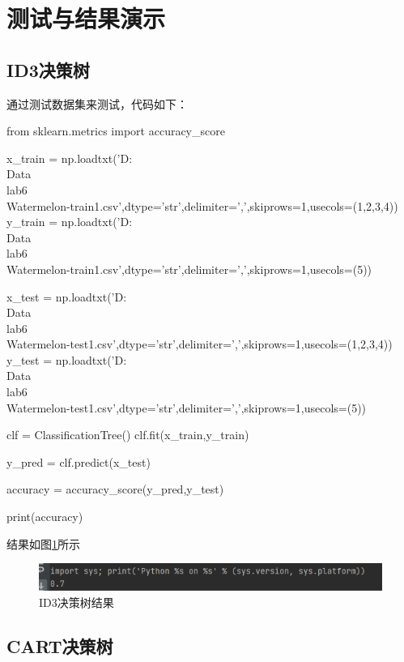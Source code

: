 \documentclass[UTF8,a4paper,10pt]{ctexart}
\begin{document}
\section{测试与结果演示}

\subsection{ID3决策树}

通过测试数据集来测试，代码如下：

\begin{python}
from sklearn.metrics import accuracy_score

x_train = np.loadtxt('D:\\Data\\lab6\\Watermelon-train1.csv',dtype='str',delimiter=',',skiprows=1,usecols=(1,2,3,4))
y_train = np.loadtxt('D:\\Data\\lab6\\Watermelon-train1.csv',dtype='str',delimiter=',',skiprows=1,usecols=(5))

x_test = np.loadtxt('D:\\Data\\lab6\\Watermelon-test1.csv',dtype='str',delimiter=',',skiprows=1,usecols=(1,2,3,4))
y_test = np.loadtxt('D:\\Data\\lab6\\Watermelon-test1.csv',dtype='str',delimiter=',',skiprows=1,usecols=(5))

clf = ClassificationTree()
clf.fit(x_train,y_train)


y_pred = clf.predict(x_test)

accuracy = accuracy_score(y_pred,y_test)

print(accuracy)
\end{python}

结果如图\ref{fig:1}所示
\begin{figure}[H]
    \centering
    \includegraphics[scale=0.3]{1.png}
    \caption{ID3决策树结果}
    \label{fig:1}
\end{figure}

\subsection{CART决策树}
\end{document}
